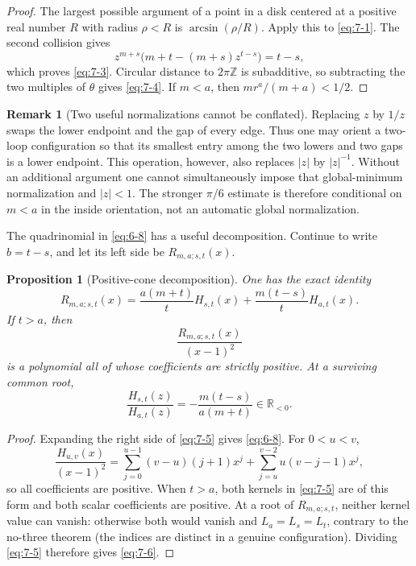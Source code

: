 \documentclass[11pt]{article}
\numberwithin{equation}{section}
\newtheorem{proposition}[theorem]{Proposition}
\theoremstyle{definition}
\newtheorem{remark}[theorem]{Remark}
\newcommand{\Z}{\mathbb Z}
\begin{document}
\begin{proof}
The largest possible argument of a point in a disk centered at a positive real
number \(R\) with radius \(\rho<R\) is
\(\arcsin(\rho/R)\).  Apply this to \eqref{eq:7-1}.  The second collision gives
\[
 z^{m+s}\bigl(m+t-(m+s)z^{t-s}\bigr)=t-s,
\]
which proves \eqref{eq:7-3}.  Circular distance to \(2\pi\Z\) is subadditive,
so subtracting the two multiples of \(\theta\) gives \eqref{eq:7-4}.  If
\(m<a\), then \(mr^a/(m+a)<1/2\).
\end{proof}

\begin{remark}[Two useful normalizations cannot be conflated]
Replacing \(z\) by \(1/z\) swaps the lower endpoint and the gap of every
edge.  Thus one may orient a two-loop configuration so that its smallest
entry among the two lowers and two gaps is a lower endpoint.  This operation,
however, also replaces \(|z|\) by \(|z|^{-1}\).  Without an additional
argument one cannot simultaneously impose that global-minimum normalization
and \(|z|<1\).  The stronger \(\pi/6\) estimate is therefore conditional on
\(m<a\) in the inside orientation, not an automatic global normalization.
\end{remark}

The quadrinomial in \eqref{eq:6-8} has a useful decomposition.  Continue to write
\(b=t-s\), and let its left side be \(R_{m,a;s,t}(x)\).

\begin{proposition}[Positive-cone decomposition]\label{prop:positivecone}
One has the exact identity
\begin{equation}
 R_{m,a;s,t}(x)=
 \frac{a(m+t)}{t}H_{s,t}(x)
 +\frac{m(t-s)}{t}H_{a,t}(x).
 \label{eq:7-5}
\end{equation}
If \(t>a\), then
\[
 \frac{R_{m,a;s,t}(x)}{(x-1)^2}
\]
is a polynomial all of whose coefficients are strictly positive.  At a
surviving common root,
\begin{equation}
 \frac{H_{s,t}(z)}{H_{a,t}(z)}
 =-\frac{m(t-s)}{a(m+t)}\in\mathbb R_{<0}.
 \label{eq:7-6}
\end{equation}
\end{proposition}

\begin{proof}
Expanding the right side of \eqref{eq:7-5} gives \eqref{eq:6-8}.  For \(0<u<v\),
\begin{equation}
 \frac{H_{u,v}(x)}{(x-1)^2}
 =\sum_{j=0}^{u-1}(v-u)(j+1)x^j
  +\sum_{j=u}^{v-2}u(v-j-1)x^j,
 \label{eq:7-7}
\end{equation}
so all coefficients are positive.  When \(t>a\), both kernels in
\eqref{eq:7-5} are of this form and both scalar coefficients are positive.
At a root of \(R_{m,a;s,t}\), neither kernel value can vanish:
otherwise both would vanish and \(L_a=L_s=L_t\), contrary to the
no-three theorem (the indices are distinct in a genuine configuration).
Dividing \eqref{eq:7-5} therefore gives \eqref{eq:7-6}.
\end{proof}
\end{document}
